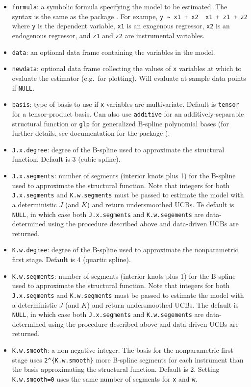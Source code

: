 \documentclass[
]{jss}
\begin{document}
\begin{itemize}
\item
  \texttt{formula}: a symbolic formula specifying the model to be
  estimated. The syntax is the same as the package 
  \citep{IVREG}. For exampe,
  \texttt{y\ \textasciitilde{}\ x1\ +\ x2\ \textbar{}\ x1\ +\ z1\ +\ z2}
  where \texttt{y} is the dependent variable, \texttt{x1} is an
  exogenous regressor, \texttt{x2} is an endogenous regressor, and
  \texttt{z1} and \texttt{z2} are instrumental variables.
\item
  \texttt{data}: an optional data frame containing the variables in the
  model.
\item
  \texttt{newdata}: optional data frame collecting the values of
  \texttt{x} variables at which to evaluate the estimator (e.g.~for
  plotting). Will evaluate at sample data points if \texttt{NULL}.
\item
  \texttt{basis}: type of basis to use if \texttt{x} variables are
  multivariate. Default is \texttt{tensor} for a tensor-product basis.
  Can also use \texttt{additive} for an additively-separable structural
  function or \texttt{glp} for generalized B-spline polynomial bases
  (for further details, see documentation for the package 
  \citep{CRS}).
\item
  \texttt{J.x.degree}: degree of the B-spline used to approximate the
  structural function. Default is 3 (cubic spline).
\item
  \texttt{J.x.segments}: number of segments (interior knots plus 1) for
  the B-spline used to approximate the structural function. Note that
  integers for both \texttt{J.x.segments} and \texttt{K.w.segments} must
  be passed to estimate the model with a deterministic \(J\) (and \(K\))
  and return undersmoothed UCBs. Te default is \texttt{NULL}, in which
  case both \texttt{J.x.segments} and \texttt{K.w.segements} are
  data-determined using the procedure described above and data-driven
  UCBs are returned.
\item
  \texttt{K.w.degree}: degree of the B-spline used to approximate the
  nonparametric first stage. Default is 4 (quartic spline).
\item
  \texttt{K.w.segments}: number of segments (interior knots plus 1) for
  the B-spline used to approximate the structural function. Note that
  integers for both \texttt{J.x.segments} and \texttt{K.w.segments} must
  be passed to estimate the model with a deterministic \(J\) (and \(K\))
  and return undersmoothed UCBs. The default is \texttt{NULL}, in which
  case both \texttt{J.x.segments} and \texttt{K.w.segements} are
  data-determined using the procedure described above and data-driven
  UCBs are returned.
\item
  \texttt{K.w.smooth}: a non-negative integer. The basis for the
  nonparametric first-stage uses \texttt{2\^{}\{K.w.smooth\}} more
  B-spline segments for each instrument than the basis approximating the
  structural function. Default is 2. Setting \texttt{K.w.smooth=0} uses
  the same number of segments for \texttt{x} and \texttt{w}.
\end{itemize}
\end{document}
